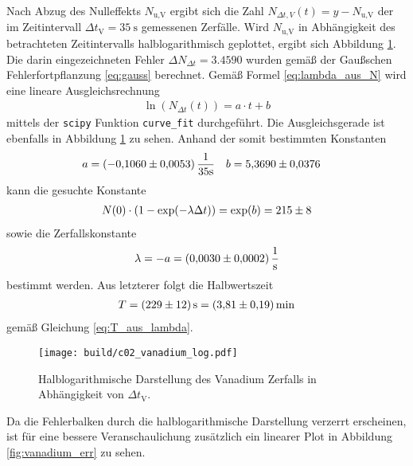\noindent
Nach Abzug des Nulleffekts $N_\text{u,V}$ ergibt sich die Zahl $N_{\Delta t,V}(t) = y- N_\text{u,V}$ der im Zeitintervall $\Delta t_\text{V} = \qty[]{35}{\second}$
gemessenen Zerfälle.
Wird $N_\text{u,V}$ in Abhängigkeit des betrachteten Zeitintervalls halblogarithmisch geplottet, ergibt sich Abbildung \ref{fig:vanadium_log}.
Die darin eingezeichneten Fehler $\Delta N_{\Delta t} = \num[]{3.4590}$ wurden gemäß der Gaußschen Fehlerfortpflanzung \eqref{eq:gauss} berechnet.
Gemäß Formel \eqref{eq:lambda_aus_N} wird eine lineare Ausgleichsrechnung 
\begin{align}
    \ln\left(N_{\Delta t}(t)\right) = a \cdot t + b
    \label{eq:linear_eq}
\end{align}
mittels der \texttt{scipy} \cite[]{scipy} Funktion \texttt{curve\_fit} durchgeführt.
Die Ausgleichsgerade ist ebenfalls in Abbildung \ref{fig:vanadium_log} zu sehen.
Anhand der somit bestimmten Konstanten
\begin{align*}
    a &= (\num{-0.1060 +- 0.0053}) \, \frac{1}{35 \unit{\second}}  & b &= \num{5.3690 +- 0.0376}
\end{align*}
kann die gesuchte Konstante 
\begin{align}
    N(0) \cdot \left(1- \exp(- \lambda \Delta t)\right) = \exp(b) = \num[]{215 +- 8}
\end{align}
sowie die Zerfallskonstante 
\begin{align}
    \lambda = - a = \qty[]{0.0030+-0.0002}{\per\second}
\end{align}
bestimmt werden.
Aus letzterer folgt die Halbwertszeit 
\begin{align}
    T = \qty[]{229 +- 12}{\second} = \qty[]{3.81 +- 0.19}{\minute}
\end{align}
gemäß Gleichung \eqref{eq:T_aus_lambda}.


\begin{figure}[H]
    \centering
    \texttt{[image: build/c02\_vanadium\_log.pdf]}
    \caption[]{Halblogarithmische Darstellung des Vanadium Zerfalls in Abhängigkeit von $\Delta t_\text{V}$.}
    \label{fig:vanadium_log}
\end{figure}

\noindent
Da die Fehlerbalken durch die halblogarithmische Darstellung verzerrt erscheinen, ist für eine bessere Veranschaulichung zusätzlich ein linearer
Plot in Abbildung \ref{fig:vanadium_err} zu sehen.

